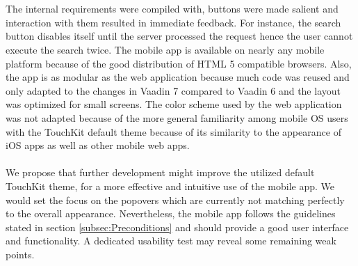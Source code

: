 \\
\\
The internal requirements were compiled with, buttons were made salient and interaction with them resulted in immediate feedback. For instance, the search button disables itself until the server processed the request hence the user cannot execute the search twice. The mobile app is available on nearly any mobile platform because of the good distribution of HTML 5 compatible browsers. Also, the app is as modular as the web application because much code was reused and only adapted to the changes in Vaadin 7 compared to Vaadin 6 and the layout was optimized for small screens. The color scheme used by the web application was not adapted because of the more general familiarity among mobile OS users with the TouchKit default theme because of its similarity to the appearance of iOS apps as well as other mobile web apps.
\\
\\
We propose that further development might improve the utilized default TouchKit theme, for a more effective and intuitive use of the mobile app. We would set the focus on the popovers which are currently not matching perfectly to the overall appearance. Nevertheless, the mobile app follows the guidelines stated in section \ref{subsec:Preconditions}  and should provide a good user interface and functionality. A dedicated usability test may reveal some remaining weak points.